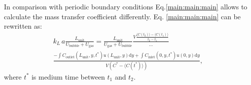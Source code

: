 \documentclass{article}
\newcommand{\beq}{\begin{equation}}
\newcommand{\feq}{\end{equation}}
\newcommand{\beqal}{\begin{equation}\begin{aligned}}
\newcommand{\feqal}{\end{aligned}\end{equation}}
\newcommand{\vol}{k_L\,a}
\newcommand{\lunit}{L_{\mathrm{unit}}}
\newcommand{\ububble}{U_{\mathrm{bubble}}}
\newcommand{\uliq}{U_{\mathrm{liq}}}
\newcommand{\ugas}{U_{\mathrm{gas}}}
\newcommand{\cinlet}{C_{\mathrm{inlet}}}
\newcommand{\coutlet}{C_{\mathrm{outlet}}}
\newcommand{\cstar}{C^{*}}
\newcommand{\volnondim}{\vol \frac{\lunit}{\ububble+\ugas}}
\begin{document}
In comparison with periodic boundary conditions Eq.\ref{main:main:main} allows to calculate the mass transfer coefficient differently. Eq. \ref{main:main:main}  can be rewritten as:
\beq
\label{main:main:main:thorough}
\begin{aligned}
\volnondim=\frac{\lunit}{\ugas+\ububble} \frac{V \frac{\langle C(t_2)\rangle - \langle C(t_1)
\rangle}{t_2-t_1}}{\dots}\\
\frac{-\int{\coutlet(\lunit,y,t^*) u(\lunit,y) \mathrm{d} y}+\int{\cinlet(0,y,t^*)
u(0,y)\mathrm{d} y}}{V (\cstar - \langle C(t^*) \rangle)},
\end{aligned}
\feq
where $t^*$ is medium time between $t_1$ and $t_2$.
\end{document}
